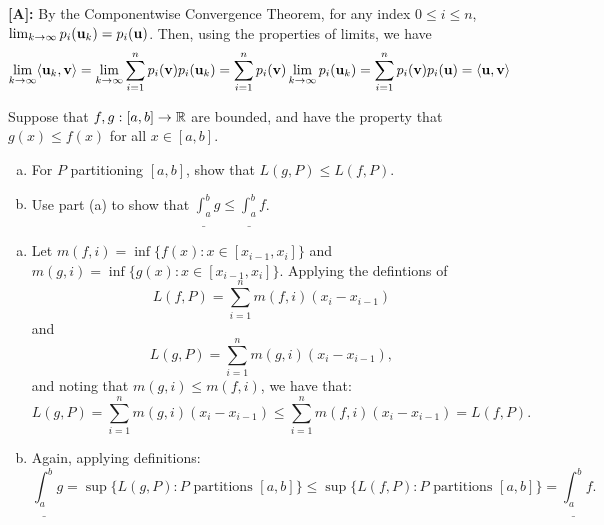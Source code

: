 \documentclass[letterpaper, twoside, 12pt]{book}
\begin{document}
\bigskip

\begin{solution} \textbf{[A]:}
By the Componentwise Convergence Theorem, for any index \(0 \leq i \leq n\), \(\lim_{k\to\infty} p_i (\mathbf u_k) = p_i (\mathbf u)\). Then, using the properties of limits, we have
\[
\lim_{k\to\infty} \langle\mathbf u_k,\mathbf v\rangle = \lim_{k\to\infty} \sum_{i=1}^n p_i (\mathbf v) p_i (\mathbf u_k) = \sum_{i=1}^n p_i (\mathbf v)\lim_{k\to\infty} p_i (\mathbf u_k) = \sum_{i=1}^n p_i (\mathbf v) p_i (\mathbf u) = \langle\mathbf u,\mathbf v\rangle
\]
\end{solution}


\newpage


\begin{exercise}[Section 6.1 \#5]
  Suppose that \(f,g:[a,b]\to\mathbb R\) are bounded, and have the property that
  \(g(x)\leq f(x)\) for all \(x\in[a,b]\).
  \begin{enumerate}[(a)]
    \item For \(P\) partitioning \([a,b]\), show that
          \(L(g,P)\leq L(f,P)\).
    \item Use part (a) to show that
          \(\underline{\int_a^b}g\leq\underline{\int_a^b}f\).
  \end{enumerate}
\end{exercise}
\begin{solution}
  \begin{enumerate}[(a)]
    \item Let \(m(f,i)=\inf\{f(x):x\in[x_{i-1},x_i]\}\) and
      \(m(g,i)=\inf\{g(x):x\in[x_{i-1},x_i]\}\).
      Applying the defintions of
      \[L(f,P)=\sum_{i=1}^n m(f,i)(x_i-x_{i-1})\] and
      \[L(g,P)=\sum_{i=1}^n m(g,i)(x_i-x_{i-1}),\]
      and noting that \(m(g,i)\leq m(f,i)\), we have that:
      \[
        L(g,P)
          =
        \sum_{i=1}^n m(g,i)(x_i-x_{i-1})
          \leq
        \sum_{i=1}^n m(f,i)(x_i-x_{i-1})
          =
        L(f,P)
      .\]
    \item Again, applying definitions:
      \[
        \underline{\int_a^b}g
          =
        \sup\{L(g,P):P\text{ partitions }[a,b]\}
          \leq
        \sup\{L(f,P):P\text{ partitions }[a,b]\}
          =
        \underline{\int_a^b}f
      .\]
  \end{enumerate}
\end{solution}
\end{document}
